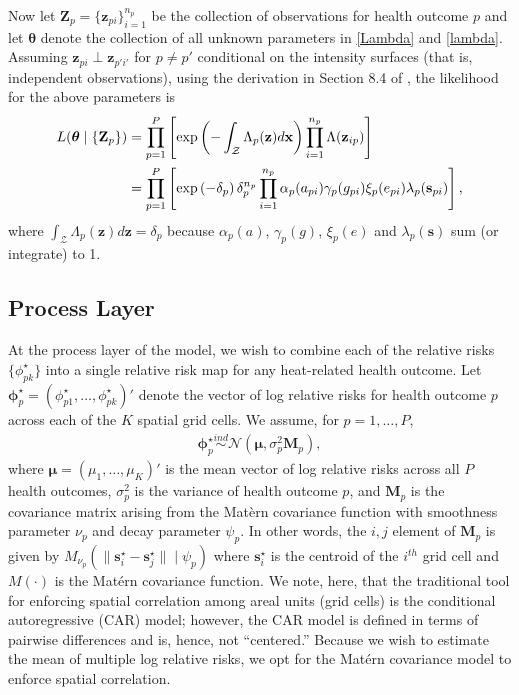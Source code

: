\documentclass[final]{statsoc}
\begin{document}
Now let $\mathbf{Z}_p = \{\mathbf{z}_{pi}\}_{i=1}^{n_p}$ be the collection of observations for
health outcome $p$ and let $\boldsymbol{\theta}$ denote the collection of all unknown parameters 
in \eqref{Lambda} and \eqref{lambda}.  Assuming $\mathbf{z}_{pi} \perp \mathbf{z}_{p'i'}$ for
 $p \neq p'$ conditional on the intensity surfaces (that is, independent observations),  
using the derivation in Section 8.4 of \cite{Banerjee2014}, the likelihood for the 
above parameters is
\begin{align}
L(\boldsymbol{\theta} \mid \{\mathbf{Z}_p\}) &=  \prod_{p=1}^P\left[\exp\left(-\int_\mathcal{Z}\Lambda_p
(\mathbf{z})d\mathbf{x}\right)\prod_{i=1}^{n_p}\Lambda(\mathbf{z}_{ip})\right] \notag \\
&= \prod_{p=1}^P\left[\exp\left(-\delta_p\right)\delta_p^{n_p}\prod_{i=1}^{n_p}
\alpha_p(a_{pi})\gamma_p(g_{pi})\xi_p(e_{pi})\lambda_p(\mathbf{s}_{pi})\right],
\label{likelihood}
\end{align}
where $\int_{\mathcal{Z}}\Lambda_p(\mathbf{z})d\mathbf{z} = \delta_p$ because $\alpha_p(a)$, 
$\gamma_p(g)$, $\xi_p(e)$ and $\lambda_p(\mathbf{s})$ sum (or integrate) to 1.


\subsection{Process Layer}\label{process}
At the process layer of the model, we wish to combine each of the relative risks 
$\{\phi_{pk}^\star\}$ into a single relative risk map for any heat-related health outcome. 
Let $\boldsymbol{\phi}^\star_{p} = (\phi^\star_{p1}, \dots, 
\phi^\star_{pk})'$ denote the vector of log relative risks for health outcome 
$p$ across each of the $K$ spatial grid cells.  We assume, for $p=1,\dots,P$,
\begin{align} 
\boldsymbol{\phi}_p^\star \overset{ind}{\sim} \mathcal{N}\left(\boldsymbol\mu, \sigma^2_p\mathbf{M}_p\right),
\label{phiprior}
\end{align}
where $\boldsymbol{\mu} = (\mu_1,\dots,\mu_K)'$ is the mean vector of log relative risks
across all $P$ health outcomes, $\sigma^2_p$ is the variance of health outcome 
$p$, and $\mathbf{M}_p$ is the covariance matrix arising from the Mat\`{e}rn covariance 
function with smoothness parameter $\nu_p$ and decay parameter $\psi_p$. In other 
words, the $i,j$ element of $\mathbf{M}_p$ is given by $M_{\nu_p}(\|\mathbf{s}_i^\star - 
\mathbf{s}_j^\star\| \mid \psi_p)$ where $\mathbf{s}^\star_i$ is the centroid of the $i^{th}$ 
grid cell and $M(\cdot)$ is the Mat\'{e}rn covariance function.  We note, here, that 
the traditional tool for enforcing spatial correlation among areal units (grid cells) 
is the conditional autoregressive (CAR) model; however, the CAR model is defined in terms 
of pairwise differences and is, hence, not ``centered.''  Because we wish to estimate 
the mean of multiple log relative risks, we opt for the Mat\'{e}rn covariance model to 
enforce spatial correlation.
\end{document}
